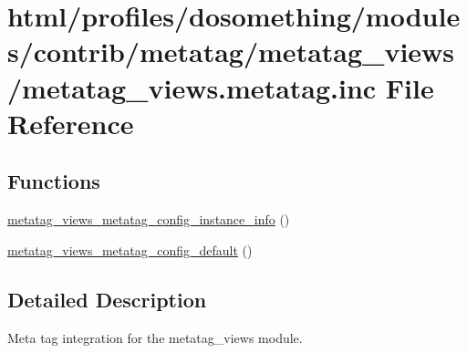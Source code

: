 \hypertarget{metatag__views_8metatag_8inc}{
\section{html/profiles/dosomething/modules/contrib/metatag/metatag\_\-views/metatag\_\-views.metatag.inc File Reference}
\label{metatag__views_8metatag_8inc}
}
\subsection*{Functions}
\begin{DoxyCompactItemize}
\item 
\hyperlink{metatag__views_8metatag_8inc_a1e15188992793740a6b2b8a7039efa98}{metatag\_\-views\_\-metatag\_\-config\_\-instance\_\-info} ()
\item 
\hyperlink{metatag__views_8metatag_8inc_ad1206297b0650e8d12f0939de86929ea}{metatag\_\-views\_\-metatag\_\-config\_\-default} ()
\end{DoxyCompactItemize}


\subsection{Detailed Description}
Meta tag integration for the metatag\_\-views module. 

